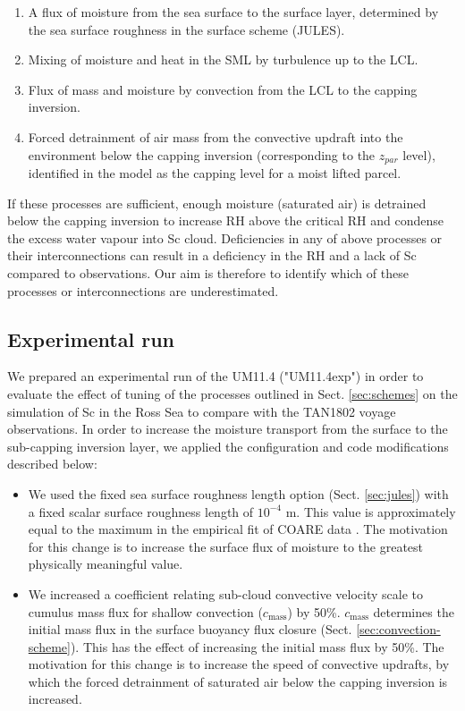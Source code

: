 \begin{enumerate}
\item A flux of moisture from the sea surface to the surface layer, determined
by the sea surface roughness in the surface scheme (JULES).
\item Mixing of moisture and heat in the SML by turbulence up to the LCL.
\item Flux of mass and moisture by convection from the LCL to the capping inversion.
\item Forced detrainment of air mass from the convective updraft into the environment
below the capping inversion (corresponding to the $z_{par}$ level),
identified in the model as the capping level for a moist lifted parcel.
\end{enumerate}

If these processes are sufficient, enough moisture (saturated air) is detrained
below the capping inversion to increase RH above the critical RH and condense the
excess water vapour into Sc cloud. Deficiencies in any of above processes or their interconnections can result in a deficiency in the RH and a lack of Sc compared to observations. Our aim is therefore to identify which of these processes or interconnections are underestimated.

\subsection{Experimental run}
\label{sec:experimental-run}

We prepared an experimental run of the UM11.4 ("UM11.4exp") in order
to evaluate the effect of tuning of the processes outlined in Sect. 
\ref{sec:schemes} on the simulation of Sc in the Ross Sea to compare
with the TAN1802 voyage observations. 
In order to increase the moisture transport from the surface to the sub-capping inversion layer, we applied the configuration and code modifications described below:

\begin{itemize}
\item We used the fixed sea surface roughness length option
(Sect. \ref{sec:jules}) with a fixed scalar surface roughness length of $10^{-4}$
m. This value is approximately equal to the maximum in the empirical
fit of COARE data \citep{fairall2003}. The motivation for this change is to increase
the surface flux of moisture to the greatest physically meaningful value.
\item We increased a coefficient relating sub-cloud convective velocity scale
to cumulus mass flux for shallow convection ($c_\text{mass}$) by 50\%. 
$c_\text{mass}$ determines the initial mass flux in the surface buoyancy
flux closure (Sect. \ref{sec:convection-scheme}). This has the effect
of increasing the initial mass flux by 50\%. The motivation for this change
is to increase the speed of convective updrafts, by which the forced
detrainment of saturated air below the capping inversion is increased.
\end{itemize}

